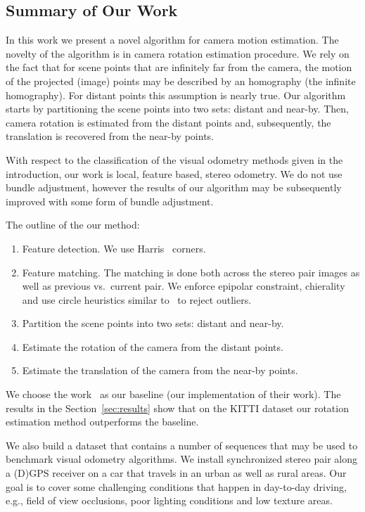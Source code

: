 \documentclass{report}
\begin{document}
\subsection{Summary of Our Work}
In this work we present a novel algorithm for camera motion
estimation.  The novelty of the algorithm is in camera rotation
estimation procedure.  We rely on the fact that for scene points that
are infinitely far from the camera, the motion of the projected
(image) points may be described by an homography (the infinite
homography). For distant points this assumption is nearly true.  Our
algorithm starts by partitioning the scene points into two sets:
distant and near-by. Then, camera rotation is estimated from the
distant points and, subsequently, the translation is recovered from
the near-by points.

With respect to the classification of the visual odometry methods
given in the introduction, our work is local, feature based, stereo
odometry.  We do not use bundle adjustment, however the results of our
algorithm may be subsequently improved with some form of bundle
adjustment.

The outline of the our method:
\begin{enumerate}
\item Feature detection.  We use Harris~\cite{Harris1987} corners.
\item Feature matching. The matching is done both across the stereo
  pair images as well as previous vs.\ current pair.  We enforce
  epipolar constraint, chierality and use circle heuristics similar
  to~\cite{Geiger2011} to reject outliers.
\item Partition the scene points into two sets: distant and near-by.
\item Estimate the rotation of the camera from the distant points.
\item Estimate the translation of the camera from the near-by points.
\end{enumerate}

We choose the work~\cite{Geiger2011} as our baseline (our
implementation of their work).  The results in the
Section~\ref{sec:results} show that on the KITTI dataset our rotation
estimation method outperforms the baseline.

We also build a dataset that contains a number of sequences that may
be used to benchmark visual odometry algorithms.  We install
synchronized stereo pair along a (D)GPS receiver on a car that travels
in an urban as well as rural areas.  Our goal is to cover some
challenging conditions that happen in day-to-day driving, e.g., field
of view occlusions, poor lighting conditions and low texture areas.
\end{document}
